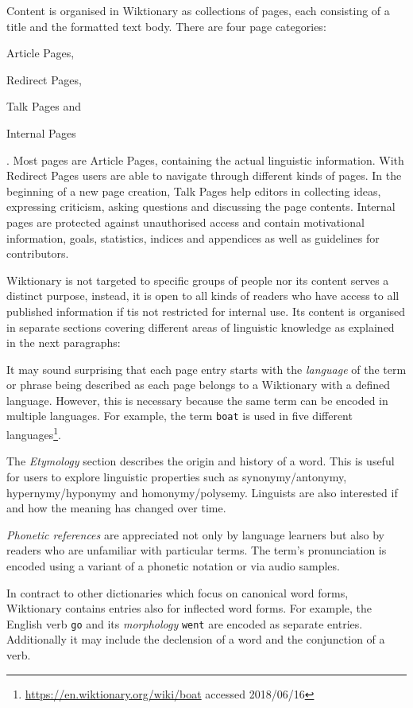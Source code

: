 \documentclass[draft,final]{vutinfth} %
\begin{document}
Content is organised in Wiktionary as collections of pages, each consisting of a title and the formatted text body. There are four page categories:
\begin{inparaenum}[1)]
		\item Article Pages,
		\item Redirect Pages,
		\item Talk Pages and
		\item Internal Pages
\end{inparaenum}.
Most pages are Article Pages, containing the actual linguistic information. With Redirect Pages users are able to navigate through different kinds of pages. In the beginning of a new page creation, Talk Pages help editors in collecting ideas, expressing criticism, asking questions and discussing the page contents. Internal pages are protected against unauthorised access and contain motivational information, goals, statistics, indices and appendices as well as guidelines for contributors. 

Wiktionary is not targeted to specific groups of people nor its content serves a distinct purpose, instead, it is open to all kinds of readers who have access to all published information if tis not restricted for internal use. Its content is organised in separate sections covering different areas of linguistic knowledge as explained in the next paragraphs: 

It may sound surprising that each page entry starts with the \textit{language} of the term or phrase being described as each page belongs to a Wiktionary with a defined language. However, this is necessary because the same term can be encoded in multiple languages. For example, the term \texttt{boat} is used in five different languages\footnote{\url{https://en.wiktionary.org/wiki/boat} accessed 2018/06/16}. 

The \textit{Etymology} section describes the origin and history of a word. This is useful for users to explore linguistic properties such as synonymy/antonymy, hypernymy/hyponymy and homonymy/polysemy. Linguists are also interested if and how the meaning has changed over time. 

\textit{Phonetic references} are appreciated not only by language learners but also by readers who are unfamiliar with particular terms. The term's pronunciation is encoded using a variant of a phonetic notation or via audio samples. 

In contract to other dictionaries which focus on canonical word forms, Wiktionary contains entries also for inflected word forms. For example, the English verb \texttt{go} and its \textit{morphology} \texttt{went} are encoded as separate entries. Additionally it may include the declension of a word and the conjunction of a verb.
\end{document}
